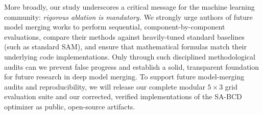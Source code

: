 More broadly, our study underscores a critical message for the machine learning community: \emph{rigorous ablation is mandatory.} We strongly urge authors of future model merging works to perform sequential, component-by-component evaluations, compare their methods against heavily-tuned standard baselines (such as standard SAM), and ensure that mathematical formulas match their underlying code implementations. Only through such disciplined methodological audits can we prevent false progress and establish a solid, transparent foundation for future research in deep model merging. To support future model-merging audits and reproducibility, we will release our complete modular $5 \times 3$ grid evaluation suite and our corrected, verified implementations of the SA-BCD optimizer as public, open-source artifacts.
